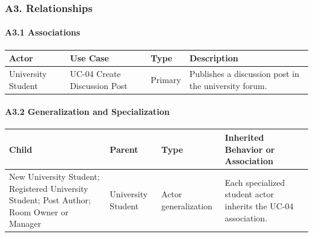 \documentclass[12pt]{article}
\renewcommand{\baselinestretch}{1.5}
\begin{document}
\hypertarget{sec:a3-relationships}{}
\subsubsection*{A3. Relationships}
\par\medskip

\hypertarget{sec:a3-1-associations}{}
\paragraph*{A3.1 Associations}
\par\medskip

\begingroup
\small
\renewcommand{\baselinestretch}{1.0}\selectfont
\renewcommand{\arraystretch}{1.15}
\setlength{\tabcolsep}{6pt}
\begin{longtable}{|>{\raggedright\arraybackslash}p{}|>{\raggedright\arraybackslash}p{}|>{\raggedright\arraybackslash}p{}|>{\raggedright\arraybackslash}p{}|}
\hline
\textbf{Actor} & \textbf{Use Case} & \textbf{Type} & \textbf{Description} \\ \hline
\endhead
University Student & UC-04 Create Discussion Post & Primary & Publishes a discussion post in the university forum. \\ \hline
\end{longtable}
\endgroup
\par\medskip

\hypertarget{sec:a3-2-generalization-and-specialization}{}
\paragraph*{A3.2 Generalization and Specialization}
\par\medskip

\begingroup
\small
\renewcommand{\baselinestretch}{1.0}\selectfont
\renewcommand{\arraystretch}{1.15}
\setlength{\tabcolsep}{6pt}
\begin{longtable}{|>{\raggedright\arraybackslash}p{}|>{\raggedright\arraybackslash}p{}|>{\raggedright\arraybackslash}p{}|>{\raggedright\arraybackslash}p{}|}
\hline
\textbf{Child} & \textbf{Parent} & \textbf{Type} & \textbf{Inherited Behavior or Association} \\ \hline
\endhead
New University Student; Registered University Student; Post Author; Room Owner or Manager & University Student & Actor generalization & Each specialized student actor inherits the UC-04 association. \\ \hline
\end{longtable}
\endgroup
\par\medskip
\end{document}
